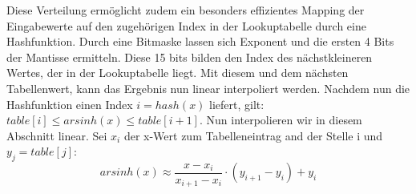 \documentclass[course=erap] {aspdoc}
\begin{document}
     Diese Verteilung ermöglicht zudem ein besonders effizientes Mapping der Eingabewerte auf den zugehörigen Index in der Lookuptabelle durch eine Hashfunktion. Durch eine Bitmaske lassen sich Exponent und die ersten 4 Bits der Mantisse ermitteln. Diese 15 bits bilden den Index des nächstkleineren Wertes, der in der Lookuptabelle liegt. Mit diesem und dem nächsten Tabellenwert, kann das Ergebnis nun linear interpoliert werden.
     Nachdem nun die Hashfunktion einen Index $i=hash(x)$ liefert, gilt: $table[i] \leq arsinh(x) \leq table[i+1]$. 
     Nun interpolieren wir in diesem Abschnitt linear. Sei $x_i$ der x-Wert zum Tabelleneintrag and der Stelle i und $y_j = table[j]$:
     \[
         arsinh(x) \approx \frac{x-x_i}{x_{i+1} - x_i}\cdot (y_{i+1}-y_i) + y_i
     \]
 
     
 
 
\end{document}
